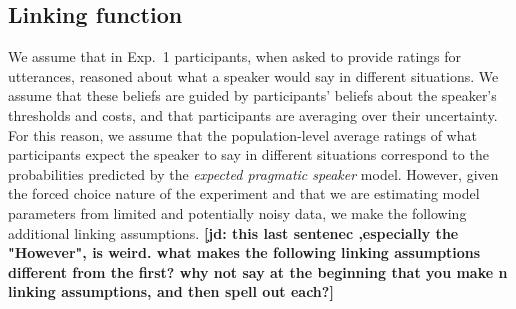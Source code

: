 \documentclass[lucida,biblatex]{sp} %
\newcommand{\jd}[1]{\textcolor{PinkyPurple}{\textbf{[jd: #1]}}}
\begin{document}



\subsection{Linking function}

We assume that in Exp.~1 participants, when asked to provide ratings for utterances, reasoned about what a speaker would say in different situations. 
We assume that these beliefs are guided by participants' beliefs about the speaker's thresholds and costs, and 
that participants are averaging over their uncertainty. For this reason, we assume that the population-level 
average ratings of what participants expect the speaker to say in different situations 
correspond to the probabilities predicted by the \textit{expected pragmatic speaker} model.
However, given the forced choice nature of the experiment and that we are estimating model 
parameters from limited and potentially noisy data, we make the following additional linking assumptions. \jd{this last sentenec ,especially the "However", is weird. what makes the following linking assumptions different from the first? why not say at the beginning that you make n linking assumptions, and then spell out each?}
\end{document}
